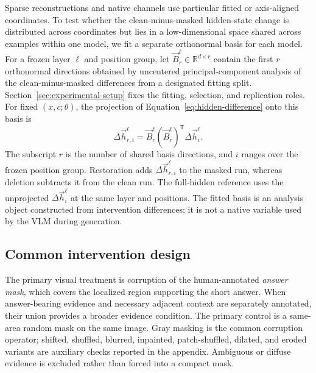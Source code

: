 Sparse reconstructions and native channels use particular fitted or axis-aligned coordinates. To test whether the clean-minus-masked hidden-state change is distributed across coordinates but lies in a low-dimensional space shared across examples within one model, we fit a separate orthonormal basis for each model. For a frozen layer $\ell$ and position group, let $\vec{B}_{r}^{\ell}\in\mathbb{R}^{d\times r}$ contain the first $r$ orthonormal directions obtained by uncentered principal-component analysis of the clean-minus-masked differences from a designated fitting split. Section~\ref{sec:experimental-setup} fixes the fitting, selection, and replication roles. For fixed $(x,c;\theta)$, the projection of Equation~\ref{eq:hidden-difference} onto this basis is
\begin{equation}
    \Delta\vec{h}_{r,i}^{\ell}
    =\vec{B}_{r}^{\ell}(\vec{B}_{r}^{\ell})^{\mathsf{T}}
      \Delta\vec{h}_{i}^{\ell}.
    \label{eq:shared-subspace-projection}
\end{equation}
The subscript $r$ is the number of shared basis directions, and $i$ ranges over the frozen position group. Restoration adds $\Delta\vec{h}_{r,i}^{\ell}$ to the masked run, whereas deletion subtracts it from the clean run. The full-hidden reference uses the unprojected $\Delta\vec{h}_{i}^{\ell}$ at the same layer and positions. The fitted basis is an analysis object constructed from intervention differences; it is not a native variable used by the VLM during generation.

\subsection{Common intervention design}

The primary visual treatment is corruption of the human-annotated \emph{answer mask}, which covers the localized region supporting the short answer. When answer-bearing evidence and necessary adjacent context are separately annotated, their union provides a broader evidence condition. The primary control is a same-area random mask on the same image. Gray masking is the common corruption operator; shifted, shuffled, blurred, inpainted, patch-shuffled, dilated, and eroded variants are auxiliary checks reported in the appendix. Ambiguous or diffuse evidence is excluded rather than forced into a compact mask.

